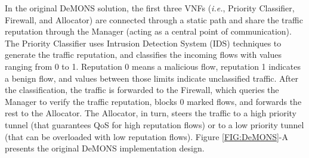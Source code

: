 
In the original DeMONS solution, the first three VNFs (\textit{i.e.}, Priority Classifier, Firewall, and Allocator) are connected through a static path and share the traffic reputation through the Manager (acting as a central point of communication). The Priority Classifier uses Intrusion Detection System (IDS) techniques to generate the traffic reputation, and classifies the incoming flows with values ranging from 0 to 1. Reputation 0 means a malicious flow, reputation 1 indicates a benign flow, and values between those limits indicate unclassified traffic. After the classification, the traffic is forwarded to the Firewall, which queries the Manager to verify the traffic reputation, blocks 0 marked flows, and forwards the rest to the Allocator. The Allocator, in turn, steers the traffic to a high priority tunnel (that guarantees QoS for high reputation flows) or to a low priority tunnel (that can be overloaded with low reputation flows). Figure \ref{FIG:DeMONS}-A presents the original DeMONS implementation design.


